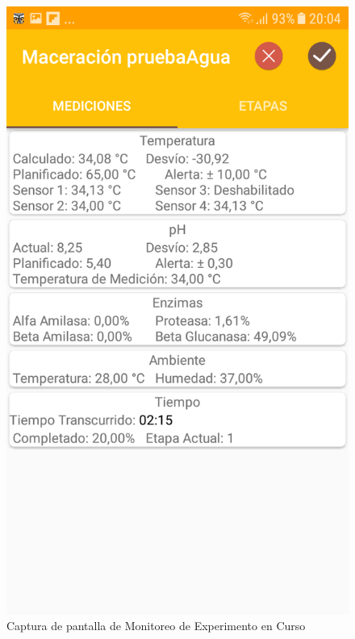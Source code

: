             \begin{figure}[h]
                \centering
                \includegraphics[scale=0.2]{software/ScreenCapture/MeasureFragment.jpg}
                \caption{Captura de pantalla de Monitoreo de Experimento en Curso}
                \label{fig:CapturaMeasureFrag}
            \end{figure}
